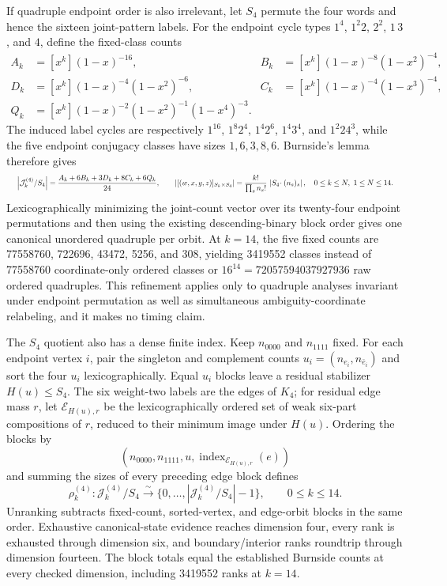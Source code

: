 \documentclass{article}
\newcommand{\fitmath}[1]{\resizebox{0.99\linewidth}{!}{$\displaystyle #1$}}
\begin{document}
If quadruple endpoint order is also irrelevant, let $S_4$ permute the four
words and hence the sixteen joint-pattern labels. For the endpoint cycle types
$1^4$, $1^2 2$, $2^2$, $1\,3$, and $4$, define the fixed-class counts
\[
  \begin{aligned}
    A_k&=[x^k](1-x)^{-16},&
    B_k&=[x^k](1-x)^{-8}(1-x^2)^{-4},\\
    D_k&=[x^k](1-x)^{-4}(1-x^2)^{-6},&
    C_k&=[x^k](1-x)^{-4}(1-x^3)^{-4},\\
    Q_k&=[x^k](1-x)^{-2}(1-x^2)^{-1}(1-x^4)^{-3}.
  \end{aligned}
\]
The induced label cycles are respectively $1^{16}$, $1^8 2^4$, $1^4 2^6$,
$1^4 3^4$, and $1^2 2 4^3$, while the five endpoint conjugacy classes have
sizes $1,6,3,8,6$. Burnside's lemma therefore gives
\begin{equation}
  \fitmath{%
    \left|\mathcal{J}^{(4)}_k/S_4\right|
      =\frac{A_k+6B_k+3D_k+8C_k+6Q_k}{24},
    \qquad
    \left|[(w,x,y,z)]_{S_k\times S_4}\right|
      =\frac{k!}{\prod_s n_s!}\,\left|S_4\!\cdot(n_s)_s\right|,
    \quad 0\leq k\leq N,\ 1\leq N\leq14.
  }
  \label{eq:optimization-crazy-preimage-cube-unordered-quadruple-quotient}
\end{equation}
Lexicographically minimizing the joint-count vector over its twenty-four
endpoint permutations and then using the existing descending-binary block order
gives one canonical unordered quadruple per orbit. At $k=14$, the five fixed
counts are 77558760, 722696, 43472, 5256, and 308, yielding 3419552 classes
instead of 77558760 coordinate-only ordered classes or
$16^{14}=72057594037927936$ raw ordered quadruples. This refinement applies only
to quadruple analyses invariant under endpoint permutation as well as
simultaneous ambiguity-coordinate relabeling, and it makes no timing claim.

The $S_4$ quotient also has a dense finite index. Keep $n_{0000}$ and
$n_{1111}$ fixed. For each endpoint vertex $i$, pair the singleton and
complement counts
$u_i=(n_{e_i},n_{\bar e_i})$ and sort the four $u_i$ lexicographically. Equal
$u_i$ blocks leave a residual stabilizer $H(u)\leq S_4$. The six weight-two
labels are the edges of $K_4$; for residual edge mass $r$, let
$\mathcal E_{H(u),r}$ be the lexicographically ordered set of weak six-part
compositions of $r$, reduced to their minimum image under $H(u)$. Ordering the
blocks by
\[
  \left(n_{0000},n_{1111},u,
    \operatorname{index}_{\mathcal E_{H(u),r}}(e)\right)
\]
and summing the sizes of every preceding edge block defines
\begin{equation}
  \rho^{(4)}_k:\mathcal J^{(4)}_k/S_4
    \overset{\sim}{\longrightarrow}
    \{0,\ldots,|\mathcal J^{(4)}_k/S_4|-1\},
  \qquad 0\leq k\leq14.
  \label{eq:optimization-crazy-preimage-cube-unordered-quadruple-ranking}
\end{equation}
Unranking subtracts fixed-count, sorted-vertex, and edge-orbit blocks in the
same order. Exhaustive canonical-state evidence reaches dimension four, every
rank is exhausted through dimension six, and boundary/interior ranks roundtrip
through dimension fourteen. The block totals equal the established Burnside
counts at every checked dimension, including 3419552 ranks at $k=14$.
\end{document}
